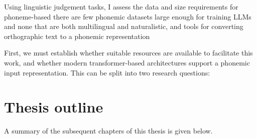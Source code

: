Using linguistic judgement tasks, I assess the data and size requirements for phoneme-based there are few phonemic datasets large enough for training LLMs and none that are both multilingual and naturalistic, and tools for converting orthographic text to a phonemic representation 


First, we must establish whether suitable resources are available to facilitate this work, and whether modern transformer-based architectures support a phonemic input representation. This can be split into two research questions:

\section{Thesis outline}

A summary of the subsequent chapters of this thesis is given below.

